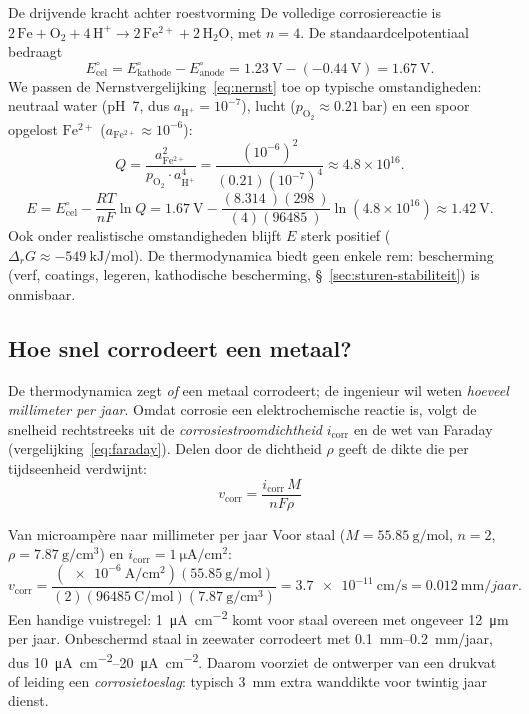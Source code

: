 \begin{voorbeeld}{De drijvende kracht achter roestvorming}
De volledige corrosiereactie is $\mathrm{2\,Fe + O_2 + 4\,H^+ \rightarrow 2\,Fe^{2+} + 2\,H_2O}$, met $n=4$. De standaardcelpotentiaal bedraagt
\[
E^\circ_{\text{cel}} = E^\circ_{\text{kathode}} - E^\circ_{\text{anode}} = \SI{1.23}{\volt} - (\SI{-0.44}{\volt}) = \SI{1.67}{\volt}.
\]
We passen de Nernstvergelijking~\eqref{eq:nernst} toe op typische omstandigheden: neutraal water (pH~7, dus $a_{\mathrm{H^+}}=10^{-7}$), lucht ($p_{\mathrm{O_2}}\approx\SI{0.21}{\bar}$) en een spoor opgelost $\mathrm{Fe^{2+}}$ ($a_{\mathrm{Fe^{2+}}}\approx10^{-6}$):
\[
Q = \frac{a_{\mathrm{Fe^{2+}}}^2}{p_{\mathrm{O_2}}\cdot a_{\mathrm{H^+}}^4} = \frac{(10^{-6})^2}{(0.21)(10^{-7})^4} \approx 4.8\times10^{16}.
\]
\[
E = E^\circ_{\text{cel}} - \frac{RT}{nF}\ln Q = \SI{1.67}{\volt} - \frac{(\SI{8.314}{})( \SI{298}{})}{(4)(\SI{96485}{})}\ln(4.8\times10^{16}) \approx \SI{1.42}{\volt}.
\]
Ook onder realistische omstandigheden blijft $E$ sterk positief ($\Delta_rG \approx \SI{-549}{\kilo\joule\per\mole}$). De thermodynamica biedt geen enkele rem: bescherming (verf, coatings, legeren, kathodische bescherming, \S~\ref{sec:sturen-stabiliteit}) is onmisbaar.
\end{voorbeeld}

\subsection{Hoe snel corrodeert een metaal?}
\label{sec:corrosiesnelheid}

De thermodynamica zegt \emph{of} een metaal corrodeert; de ingenieur wil weten \emph{hoeveel millimeter per jaar}. Omdat corrosie een elektrochemische reactie is, volgt de snelheid rechtstreeks uit de \emph{corrosiestroomdichtheid} $i_\mathrm{corr}$ en de wet van Faraday (vergelijking~\eqref{eq:faraday}). Delen door de dichtheid $\rho$ geeft de dikte die per tijdseenheid verdwijnt:
\begin{equation}
\boxed{\;v_\mathrm{corr} = \frac{i_\mathrm{corr}\,M}{nF\rho}\;}
\label{eq:corrosiesnelheid}
\end{equation}

\begin{voorbeeld}{Van microampère naar millimeter per jaar}
Voor staal ($M = \SI{55.85}{\gram\per\mole}$, $n=2$, $\rho = \SI{7.87}{\gram\per\centi\metre\cubed}$) en $i_\mathrm{corr} = \SI{1}{\micro\ampere\per\centi\metre\squared}$:
\[
v_\mathrm{corr} = \frac{(\SI{e-6}{\ampere\per\centi\metre\squared})(\SI{55.85}{\gram\per\mole})}{(2)(\SI{96485}{\coulomb\per\mole})(\SI{7.87}{\gram\per\centi\metre\cubed})} = \SI{3.7e-11}{\centi\metre\per\second} = \SI{0.012}{\milli\metre}/jaar.
\]
Een handige vuistregel: \SI{1}{\micro\ampere\per\centi\metre\squared} komt voor staal overeen met ongeveer \SI{12}{\micro\metre} per jaar. Onbeschermd staal in zeewater corrodeert met \SIrange{0.1}{0.2}{\milli\metre}/jaar, dus \SIrange{10}{20}{\micro\ampere\per\centi\metre\squared}. Daarom voorziet de ontwerper van een drukvat of leiding een \emph{corrosietoeslag}: typisch \SI{3}{\milli\metre} extra wanddikte voor twintig jaar dienst.
\end{voorbeeld}

